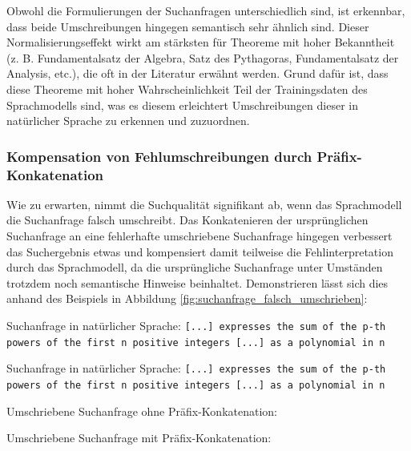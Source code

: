 \documentclass[12pt,letterpaper]{article} %
\begin{document}
Obwohl die Formulierungen der Suchanfragen unterschiedlich sind, ist erkennbar, dass beide Umschreibungen hingegen semantisch sehr ähnlich sind.
Dieser Normalisierungseffekt wirkt am stärksten für Theoreme mit hoher Bekanntheit (z. B. Fundamentalsatz der Algebra, Satz des Pythagoras, Fundamentalsatz der Analysis, etc.), die oft in der Literatur erwähnt werden. %
Grund dafür ist, dass diese Theoreme mit hoher Wahrscheinlichkeit Teil der Trainingsdaten des Sprachmodells \citep[S. 1]{abdin_phi-3_2024} sind, was es diesem erleichtert Umschreibungen dieser in natürlicher Sprache zu erkennen und zuzuordnen.

\subsubsection{Kompensation von Fehlumschreibungen durch Präfix-Konkatenation}
\label{sec:kompensation_fehlumschreibungen}

Wie zu erwarten, nimmt die Suchqualität signifikant ab, wenn das Sprachmodell die Suchanfrage falsch umschreibt.
Das Konkatenieren der ursprünglichen Suchanfrage an eine fehlerhafte umschriebene Suchanfrage hingegen verbessert das Suchergebnis etwas und kompensiert damit teilweise die Fehlinterpretation durch das Sprachmodell, da die ursprüngliche Suchanfrage unter Umständen trotzdem noch semantische Hinweise beinhaltet.
Demonstrieren lässt sich dies anhand des Beispiels in Abbildung \ref{fig:suchanfrage_falsch_umschrieben}:

\centering
\begin{minipage}[t]{0.495\textwidth}
    \scriptsize
    \begin{mybox}{Suchanfrage in natürlicher Sprache:}
    \texttt{[...] expresses the sum of the p-th powers of the first n positive integers [...] as a polynomial in n}
    \end{mybox}
\end{minipage}
\begin{minipage}[t]{0.495\textwidth}
    \scriptsize
    \begin{mybox}{Suchanfrage in natürlicher Sprache:}
    \texttt{[...] expresses the sum of the p-th powers of the first n positive integers [...] as a polynomial in n}
    \end{mybox}
\end{minipage}
\begin{minipage}[t]{0.495\textwidth}
    \scriptsize
    \begin{mybox}{Umschriebene Suchanfrage ohne Präfix-Konkatenation:}
    \texttt{}
    \end{mybox}
\end{minipage}
\begin{minipage}[t]{0.495\textwidth}
    \scriptsize
    \begin{mybox}{Umschriebene Suchanfrage mit Präfix-Konkatenation:}
    \texttt{}
    \end{mybox}
\end{minipage}
\label{fig:suchanfrage_falsch_umschrieben}
\end{document}
